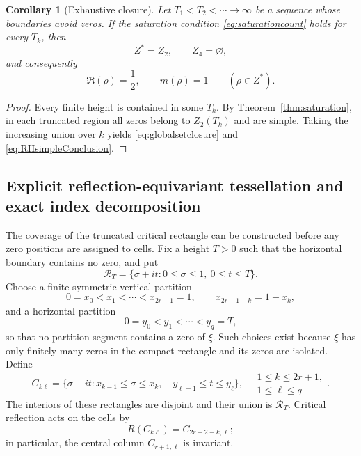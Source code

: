 \documentclass[11pt]{amsart}
\newtheorem{corollary}[theorem]{Corollary}
\theoremstyle{definition}
\theoremstyle{remark}
\begin{document}
\begin{corollary}[Exhaustive closure]\label{cor:exhaustive}
Let $T_1<T_2<\cdots\to\infty$ be a sequence whose boundaries avoid zeros. If the saturation condition \eqref{eq:saturationcount} holds for every $T_k$, then
\begin{equation}\label{eq:globalsetclosure}
 Z^*=Z_2,\qquad Z_4=\varnothing,
\end{equation}
and consequently
\begin{equation}\label{eq:RHsimpleConclusion}
 \Re(\rho)=\frac12,\qquad m(\rho)=1\qquad(\rho\in Z^*).
\end{equation}
\end{corollary}

\begin{proof}
Every finite height is contained in some $T_k$. By Theorem~\ref{thm:saturation}, in each truncated region all zeros belong to $Z_2(T_k)$ and are simple. Taking the increasing union over $k$ yields \eqref{eq:globalsetclosure} and \eqref{eq:RHsimpleConclusion}.
\end{proof}

\subsection{Explicit reflection-equivariant tessellation and exact index decomposition}
\label{subsec:explicit-global-tessellation}

The coverage of the truncated critical rectangle can be constructed before any
zero positions are assigned to cells.  Fix a height $T>0$ such that the
horizontal boundary contains no zero, and put
\begin{equation}\label{eq:global-critical-rectangle}
 \mathcal R_T=\{\sigma+it:0\leq\sigma\leq1,\ 0\leq t\leq T\}.
\end{equation}
Choose a finite symmetric vertical partition
\begin{equation}\label{eq:symmetric-vertical-partition}
 0=x_0<x_1<\cdots <x_{2r+1}=1,
 \qquad x_{2r+1-k}=1-x_k,
\end{equation}
and a horizontal partition
\begin{equation}\label{eq:horizontal-partition}
 0=y_0<y_1<\cdots <y_q=T,
\end{equation}
so that no partition segment contains a zero of $\xi$.  Such choices exist
because $\xi$ has only finitely many zeros in the compact rectangle and its
zeros are isolated.  Define
\begin{equation}\label{eq:explicit-tessellation-cells}
 C_{k\ell}=\{\sigma+it:
 x_{k-1}\leq\sigma\leq x_k,\quad
 y_{\ell-1}\leq t\leq y_\ell\},
 \quad
 \substack{1\leq k\leq2r+1,\\1\leq\ell\leq q}.
\end{equation}
The interiors of these rectangles are disjoint and their union is
$\mathcal R_T$.  Critical reflection acts on the cells by
\begin{equation}\label{eq:tessellation-reflection-action}
 R(C_{k\ell})=C_{2r+2-k,\ell};
\end{equation}
in particular, the central column $C_{r+1,\ell}$ is invariant.
\end{document}
